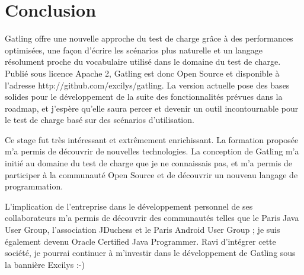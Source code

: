 \chapter{Conclusion}

Gatling offre une nouvelle approche du test de charge grâce à des performances optimisées, une façon d'écrire les scénarios plus naturelle et un langage résolument proche du vocabulaire utilisé dans le domaine du test de charge. Publié sous licence Apache 2, Gatling est donc Open Source et disponible à l'adresse http://github.com/excilys/gatling. La version actuelle pose des bases solides pour le développement de la suite des fonctionnalités prévues dans la roadmap, et j'espère qu'elle saura percer et devenir un outil incontournable pour le test de charge basé sur des scénarios d'utilisation.

Ce stage fut très intéressant et extrêmement enrichissant. La formation proposée m'a permis de découvrir de nouvelles technologies. La conception de Gatling m'a initié au domaine du test de charge que je ne connaissais pas, et m'a permis de participer à la communauté Open Source et de découvrir un nouveau langage de programmation. 

L'implication de l'entreprise dans le développement personnel de ses collaborateurs m'a permis de découvrir des communautés telles que le Paris Java User Group, l'association JDuchess et le Paris Android User Group ; je suis également devenu Oracle Certified Java Programmer. Ravi d'intégrer cette société, je pourrai continuer à m'investir dans le développement de Gatling sous la bannière Excilys :-)

